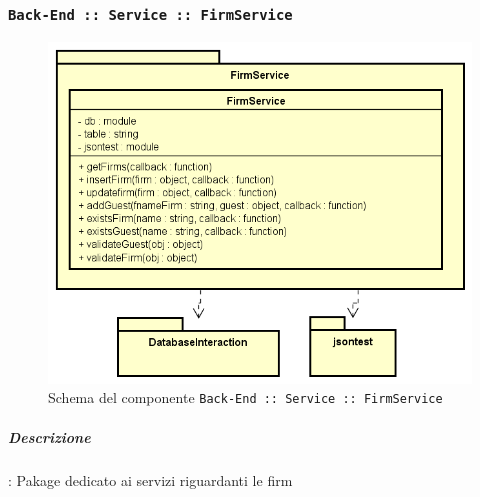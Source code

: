 \documentclass[../DefinizioneDiProdotto_v3.0.0.tex]{subfiles}
\begin{document}
\subsubsection{\texttt{Back-End :: Service :: FirmService}}
\begin{figure}[!h]
	\centering
	\includegraphics[scale=0.7]{Architettura/Back-End/Service/FirmService.png}
	\caption{Schema del componente \texttt{Back-End :: Service :: FirmService}}
\end{figure}

\subparagraph{Descrizione}: Pakage dedicato ai servizi riguardanti le firm
\end{document}
